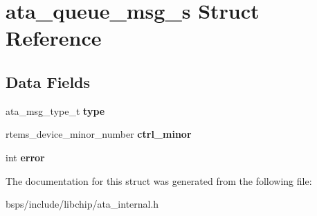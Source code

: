 \hypertarget{structata__queue__msg__s}{}\section{ata\+\_\+queue\+\_\+msg\+\_\+s Struct Reference}
\label{structata__queue__msg__s}
\subsection*{Data Fields}
\begin{DoxyCompactItemize}
\item 
\mbox{\label{structata__queue__msg__s_a1b760522310a86ef42d2d2ec5f532fe5}} 
ata\+\_\+msg\+\_\+type\+\_\+t {\bfseries type}
\item 
\mbox{\label{structata__queue__msg__s_a538f3a77e9f336d99960da649a99bbe8}} 
rtems\+\_\+device\+\_\+minor\+\_\+number {\bfseries ctrl\+\_\+minor}
\item 
\mbox{\label{structata__queue__msg__s_a555f80dff266e0d8ed638e3b7823b680}} 
int {\bfseries error}
\end{DoxyCompactItemize}


The documentation for this struct was generated from the following file\+:\begin{DoxyCompactItemize}
\item 
bsps/include/libchip/ata\+\_\+internal.\+h\end{DoxyCompactItemize}
